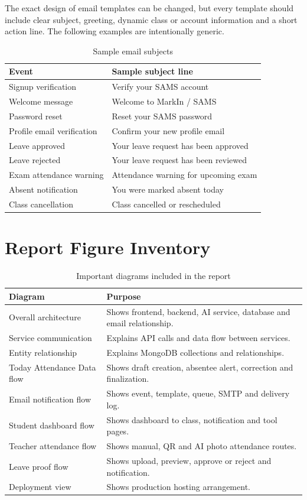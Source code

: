 The exact design of email templates can be changed, but every template should include clear subject, greeting, dynamic class or account information and a short action line. The following examples are intentionally generic.

\begin{table}[H]
\centering
\caption{Sample email subjects}
\label{tab:email-subjects}
\begin{tabularx}{\textwidth}{p{4cm} X}
\toprule
\textbf{Event} & \textbf{Sample subject line}\\
\midrule
Signup verification & Verify your SAMS account\\
Welcome message & Welcome to MarkIn / SAMS\\
Password reset & Reset your SAMS password\\
Profile email verification & Confirm your new profile email\\
Leave approved & Your leave request has been approved\\
Leave rejected & Your leave request has been reviewed\\
Exam attendance warning & Attendance warning for upcoming exam\\
Absent notification & You were marked absent today\\
Class cancellation & Class cancelled or rescheduled\\
\bottomrule
\end{tabularx}
\end{table}

\section{Report Figure Inventory}

\begin{table}[H]
\centering
\caption{Important diagrams included in the report}
\label{tab:figure-inventory}
\begin{tabularx}{\textwidth}{p{4cm} X}
\toprule
\textbf{Diagram} & \textbf{Purpose}\\
\midrule
Overall architecture & Shows frontend, backend, AI service, database and email relationship.\\
Service communication & Explains API calls and data flow between services.\\
Entity relationship & Explains MongoDB collections and relationships.\\
Today Attendance Data flow & Shows draft creation, absentee alert, correction and finalization.\\
Email notification flow & Shows event, template, queue, SMTP and delivery log.\\
Student dashboard flow & Shows dashboard to class, notification and tool pages.\\
Teacher attendance flow & Shows manual, QR and AI photo attendance routes.\\
Leave proof flow & Shows upload, preview, approve or reject and notification.\\
Deployment view & Shows production hosting arrangement.\\
\bottomrule
\end{tabularx}
\end{table}

